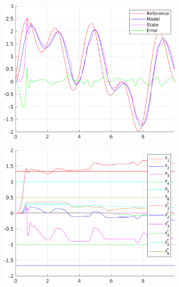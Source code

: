 \documentclass[12pt,a4paper]{article}
\begin{document}
	\begin{figure}[H]
		\centering
		\begin{subfigure}{.45\textwidth}
			\centering
			\includegraphics[width=1\textwidth]{Graphics/NonLinearState1.png}
		\end{subfigure}%
		\begin{subfigure}{.45\textwidth}
			\centering
			\includegraphics[width=1\textwidth]{Graphics/NonLinearParameters1.png}
		\end{subfigure}
		\begin{subfigure}{.45\textwidth}
			\centering

\end{subfigure}
\end{figure}
\end{document}
